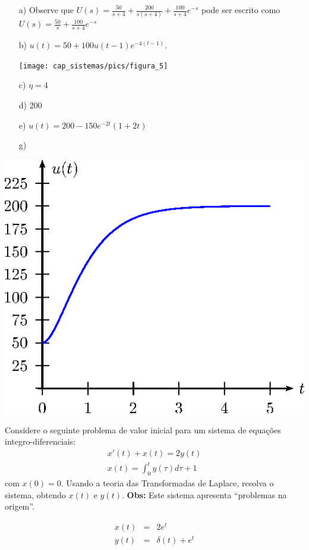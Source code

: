 \begin{resp}
\begin{itemize}
 \item [a)] Observe que $U(s)=\frac{50}{s+4}+\frac{200}{s(s+4)}+\frac{100}{s+4}e^{-s}$ pode ser escrito como $U(s)=\frac{50}{s}+\frac{100}{s+4}e^{-s}$ 
  \item [b)] $u(t)=50+100u(t-1)e^{-4(t-1)}$.
  \begin{center}

\texttt{[image: cap\_sistemas/pics/figura\_5]}\end{center}
  \item [c)] $\eta=4$
 \item [d)] 200
 \item[e)] $u(t)=200-150e^{-2t}\left(1+2t\right)$
 \item [g)] 
\end{itemize}
\begin{center}

\includegraphics{cap_sistemas/pics/figura_6}\end{center}
\end{resp}
\begin{exer} Considere o seguinte problema de valor inicial para um sistema de equações integro-diferenciais:
\begin{eqnarray*}
 x'(t) +x(t) = 2 y(t)\\
 x(t) = \int_0^t y(\tau) d\tau + 1
\end{eqnarray*}
com $x(0)=0$. Usando a teoria das Transformadas de Laplace, resolva o sistema, obtendo $x(t)$ e $y(t)$.
{\bf Obs:}  Este sistema apresenta ``problemas na origem''. 
\end{exer}
\begin{resp}
 \begin{eqnarray}
  x(t)&=&2e^t  \\
  y(t)&=&\delta(t)+e^t
 \end{eqnarray}
\end{resp}


